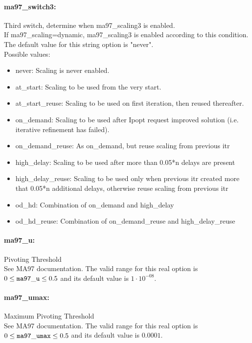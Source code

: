 \paragraph{ma97\_switch3:}\label{opt:ma97_switch3} Third switch, determine when ma97\_scaling3 is enabled. \\
 If ma97\_scaling=dynamic, ma97\_scaling3 is
enabled according to this condition. The default value for this string option is "never".
\\ 
Possible values:
\begin{itemize}
   \item never: Scaling is never enabled.
   \item at\_start: Scaling to be used from the very start.
   \item at\_start\_reuse: Scaling to be used on first iteration, then
reused thereafter.
   \item on\_demand: Scaling to be used after Ipopt request improved
solution (i.e. iterative refinement has failed).
   \item on\_demand\_reuse: As on\_demand, but reuse scaling from previous
itr
   \item high\_delay: Scaling to be used after more than 0.05*n
delays are present
   \item high\_delay\_reuse: Scaling to be used only when previous itr
created more that 0.05*n additional delays,
otherwise reuse scaling from previous itr
   \item od\_hd: Combination of on\_demand and high\_delay
   \item od\_hd\_reuse: Combination of on\_demand\_reuse and
high\_delay\_reuse
\end{itemize}

\paragraph{ma97\_u:}\label{opt:ma97_u} Pivoting Threshold \\
 See MA97 documentation. The valid range for this real option is 
$0 \le {\tt ma97\_u } \le 0.5$
and its default value is $1 \cdot 10^{-08}$.


\paragraph{ma97\_umax:}\label{opt:ma97_umax} Maximum Pivoting Threshold \\
 See MA97 documentation. The valid range for this real option is 
$0 \le {\tt ma97\_umax } \le 0.5$
and its default value is $0.0001$.


